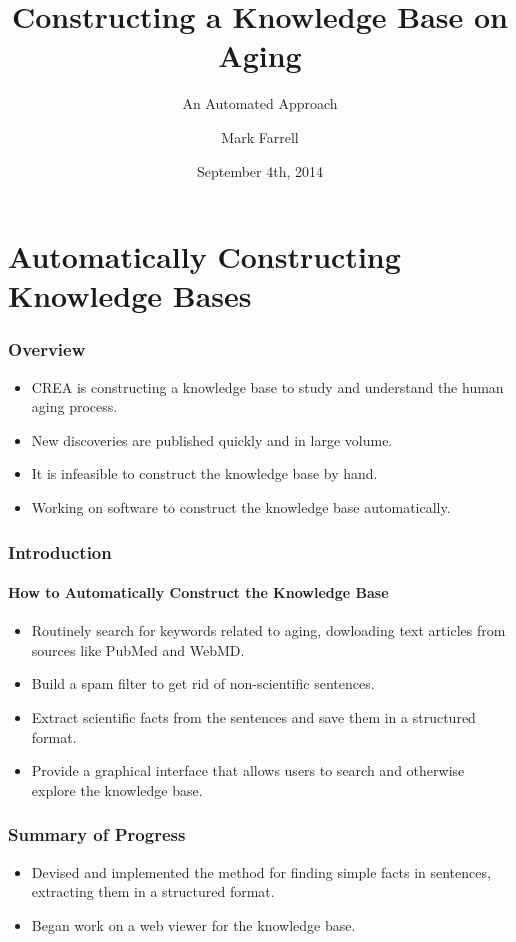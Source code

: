 \documentclass[mathserif]{beamer}
\title{Constructing a Knowledge Base on Aging}
\subtitle{An Automated Approach}
\author{Mark Farrell}
\institute
{

Undergraduate Student, University of Waterloo \and

\inst{}%
Center for Research and Education on Aging \\
Lawrence Berkeley National Laboratory \\
University of California, Berkeley

}
\date{September 4th, 2014}
\begin{document}
\frame{\titlepage}

\section{Automatically Constructing Knowledge Bases}
\begin{frame}

\frametitle{Overview}

\begin{itemize}[<+->]

\item CREA is constructing a knowledge base to study and
understand the human aging process.
\item New discoveries are published quickly and in large
volume.
\item It is infeasible to construct the knowledge base by
hand.
\item Working on software to construct the knowledge base
automatically.

\end{itemize}

\end{frame}

\begin{frame}

\frametitle{Introduction}
\framesubtitle{How to Automatically Construct the Knowledge Base}

\begin{itemize}[<+->]

\item Routinely search for keywords related to aging, dowloading
text articles from sources like PubMed and WebMD.
\item Build a spam filter to get rid of non-scientific sentences.
\item Extract scientific facts from the sentences and save them
in a structured format.
\item Provide a graphical interface that allows users to search
and otherwise explore the knowledge base.

\end{itemize}

\end{frame}

\begin{frame}

\frametitle{Summary of Progress}

\begin{itemize}[<+->]

\item Devised and implemented the method for finding simple facts
in sentences, extracting them in a structured format.


\item Began work on a web viewer for the knowledge base.

\end{itemize}

\end{frame}
\end{document}
